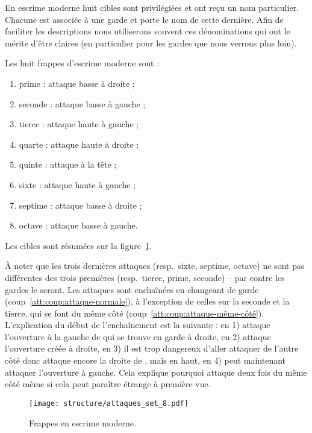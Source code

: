 En escrime moderne huit cibles sont privilégiées et ont reçu un nom particulier.
Chacune est associée à une garde et porte le nom de cette dernière.
Afin de faciliter les descriptions nous utiliserons souvent ces dénominations qui ont le mérite d'être claires (en particulier pour les gardes que nous verrons plus loin).


\begin{coup}
	\label{att:coup:série-8}

	\noindent
	Les huit frappes d'escrime moderne sont :
	\begin{enumerate}
		\item prime : attaque basse à droite ;
		\item seconde : attaque basse à gauche ;
		\item tierce : attaque haute à gauche ;
		\item quarte : attaque haute à droite ;
		\item quinte : attaque à la tête ;
		\item sixte : attaque haute à gauche ;
		\item septime : attaque basse à droite ;
		\item octave : attaque basse à gauche.
	\end{enumerate}

	Les cibles sont résumées sur la figure~\ref{att:fig:série-8}.
\end{coup}


À noter que les trois dernières attaques (resp.\ sixte, septime, octave) ne sont pas différentes des trois premières (resp.\ tierce, prime, seconde) -- par contre les gardes le seront.
Les attaques sont enchaînées en changeant de garde (coup~\ref{att:coup:attaque-normale}), à l'exception de celles sur la seconde et la tierce, qui se font du même côté (coup~\ref{att:coup:attaque-même-côté}).
L'explication du début de l'enchaînement est la suivante : en 1) \A attaque l'ouverture à la gauche de \D qui se trouve en garde à droite, en 2) \A attaque l'ouverture créée à droite, en 3) il est trop dangereux d'aller attaquer de l'autre côté donc \A attaque encore la droite de \D, mais en haut, en 4) \A peut maintenant attaquer l'ouverture à gauche.
Cela explique pourquoi \A attaque deux fois du même côté même si cela peut paraître étrange à première vue.


\begin{figure}[ht]
	\centering
	\texttt{[image: structure/attaques\_set\_8.pdf]}
	\caption{Frappes en escrime moderne.}
	\label{att:fig:série-8}
\end{figure}


